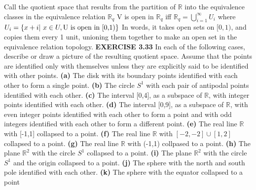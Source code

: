 \documentclass[12pt]{article}
\begin{document}
  Call the quotient space that results from the partition of \(\mathbb{R}\) into the equivalence classes in the equivalence relation \(\mathbb{R}_q\)
  \newline \newline
  V is open in \(\mathbb{R}_q\) iff \(\mathbb{R}_q = \bigcup_{i=1}^{\infty}U_i\)
  where \(U_i = \{x+i|\ x \in U, \textup{U is open in [0,1)}\}\)
  \newline \newline
  In words, it takes open sets on \([0,1)\), and copies them every 1 unit, unioning them together to make an open set in the equivalence relation topology.
  \newpage
  \noindent
  \textbf{EXERCISE 3.33}
  In each of the following cases, describe or draw a picture of the resulting quotient space. Assume that the points are identified only with themselves unless they are explicitly said to be identified with other points.
  \newline
  \textbf{(a)} The disk with its boundary points identified with each other to form a single point. \newline
  \textbf{(b)} The circle \(S^1\) with each pair of antipodal points identified with each other. \newline
  \textbf{(c)} The interval [0,4], as a subspace of \(\mathbb{R}\), with integer points identified with each other. \newline
  \textbf{(d)} The interval [0,9], as a subspace of \(\mathbb{R}\), with even integer points identified with each other to form a point and with odd integers identified with each other to form a different point. \newline
  \textbf{(e)} The real line \(\mathbb{R}\) with [-1,1] collapsed to a point. \newline
  \textbf{(f)} The real line \(\mathbb{R}\) with \([-2,-2] \cup [1,2]\) collapsed to a point. \newline
  \textbf{(g)} The real line \(\mathbb{R}\) with (-1,1) collpased to a point. \newline
  \textbf{(h)} The plane \(\mathbb{R}^2\) with the circle \(S^1\) collapsed to a point. \newline
  \textbf{(i)} The plane \(\mathbb{R}^2\) with the circle \(S^1\) and the origin collapsed to a point. \newline
  \textbf{(j)} The sphere with the north and south pole identified with each other. \newline
  \textbf{(k)} The sphere with the equator collapsed to a point
  \newline
\end{document}
